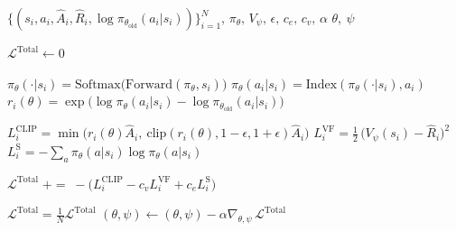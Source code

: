 \documentclass{article}
\newcommand{\coloneqq}{\mathrel{\mathop:}=}
\begin{document}
\begin{algorithm}
\caption*{\textbf{Algorithm:} Gradient Propagation (Mini-Batch)}
\begin{algorithmic}[1]
    \Require $\{(s_i, a_i, \hat{A}_i, \hat{R}_i, \log \pi_{\theta_{\text{old}}}(a_i|s_i))\}_{i=1}^N,\, \pi_{\theta},\, V_{\psi},\, \epsilon,\, c_e,\, c_v,\, \alpha$
    \Ensure $\theta,\ \psi$

    \State $\mathcal{L}^{\text{Total}} \gets 0$ 

        \State $\pi_\theta(\cdot|s_i) = \text{Softmax}\big(\text{Forward}(\pi_{\theta}, s_i)\big)$ 
        \State $\pi_{\theta}(a_i|s_i) = \text{Index}(\pi_\theta(\cdot|s_i), a_i)$
        \State $r_i(\theta) = \exp\!\big(\log \pi_{\theta}(a_i|s_i) - \log \pi_{\theta_{\text{old}}}(a_i|s_i)\big)$

        \State $L^{\text{CLIP}}_i = \min\!\big( r_i(\theta)\hat{A}_i,\ \text{clip}(r_i(\theta),1-\epsilon,1+\epsilon)\hat{A}_i \big)$ 
        \State $L^{\text{VF}}_i = \tfrac{1}{2}\,\big(V_{\psi}(s_i) - \hat{R}_i\big)^2$ 
        \State $L^{\text{S}}_i = - \sum_{a} \pi_{\theta}(a|s_i)\log \pi_{\theta}(a|s_i)$ 

        \State $\mathcal{L}^{\text{Total}} \;{+}{=}\; -\big(L^{\text{CLIP}}_i - c_v L^{\text{VF}}_i + c_e L^{\text{S}}_i\big)$ 
    \EndFor
    
    \State $\mathcal{L}^{\text{Total}} = \tfrac{1}{N}\mathcal{L}^{\text{Total}}$ 
    \State $(\theta,\psi) \gets (\theta,\psi) - \alpha\nabla_{\theta,\psi}\,\mathcal{L}^{\text{Total}}$
    
\end{algorithmic}
\end{algorithm}
\end{document}
